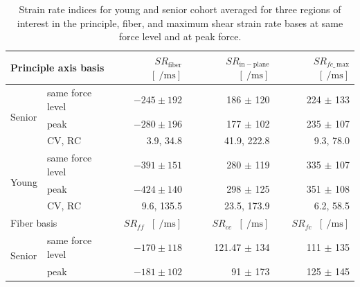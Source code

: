 \begin{table}[!htb]
\vspace{+0.2cm}
\caption[Strain rate indices for young and senior cohort at same force level and at peak force]{Strain rate indices for young and senior cohort averaged for three regions of interest in the principle, fiber, and maximum shear strain rate bases at same force level and at peak force.}
\label{tab: SR2_1}
\begin{center}
\begin{threeparttable}
\begin{tabular}{@{}llrrr@{}}
\toprule[1pt]\midrule[0.3pt]   
\multicolumn{2}{l}{Principle axis basis}	 	& $SR_\mathrm{fiber}$\tnote{$\dagger$} $\; \left[ \SI{}{\per\milli\second}\right]$ & $SR_\mathrm{in-plane}$\tnote{$\dagger$}   $\; \left[ \SI{}{\per\milli\second}\right]$ & $SR_{fc\_\,\mathrm{max}}$\tnote{$\dagger$}  $\; \left[ \SI{}{\per\milli\second}\right]$ \\ \midrule
\multicolumn{1}{l}{\multirow{3}{*}{Senior}} & same force level & $-245 \pm 192$  & 186 $\pm$ 120    & 224 $\pm$ 133  	\\
\multicolumn{1}{l}{}                        & peak             & $-280 \pm 196$  & 177 $\pm$ 102    & 235 $\pm$ 107  	\\
\multicolumn{1}{l}{}                        & CV, RC           & 3.9, 34.8   	 & 41.9, 222.8      & 9.3, 78.0  		\\ [6pt]
\multicolumn{1}{l}{\multirow{3}{*}{Young}}  & same force level & $-391 \pm 151$  & 280 $\pm$ 119    & 335 $\pm$ 107  	\\
\multicolumn{1}{l}{}                        & peak             & $-424 \pm 140$  & 298 $\pm$ 125    & 351 $\pm$ 108  	\\
\multicolumn{1}{l}{}                        & CV, RC           & 9.6, 135.5      & 23.5, 173.9      & 6.2, 58.5  		\\ \toprule[0.3pt]\midrule[0.3pt]
\multicolumn{2}{l}{Fiber basis}				& $SR_{ff}$   $\; \left[ \SI{}{\per\milli\second}\right]$     & $SR_{cc}$  $\; \left[ \SI{}{\per\milli\second}\right]$      & $SR_{fc}$  $\; \left[ \SI{}{\per\milli\second}\right]$      	\\ \midrule
\multicolumn{1}{l}{\multirow{2}{*}{Senior}}                     & same force level & $-170 \pm 118$  & 121.47 $\pm$ 134 & 111 $\pm$ 135  	\\
                                            & peak             & $-181 \pm 102$\tnote{$\dagger$} & 91 $\pm$ 173     & 125 $\pm$ 145  	\\ [6pt]

\end{tabular}
\end{threeparttable}
\end{center}
\end{table}
